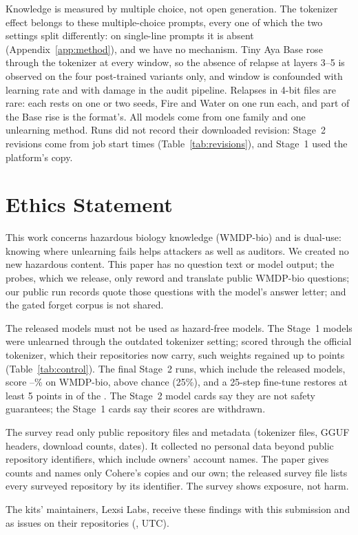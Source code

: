 \documentclass[11pt]{article}
\begin{document}
Knowledge is measured by multiple choice, not open generation. The tokenizer effect belongs to these multiple-choice prompts, every one of which the two settings split differently: on single-line prompts it is absent (Appendix~\ref{app:method}), and we have no mechanism. Tiny Aya Base rose through the tokenizer at every window, so the absence of relapse at layers 3--5 is observed on the four post-trained variants only, and window is confounded with learning rate and with damage in the audit pipeline. Relapses in 4-bit files are rare: each rests on one or two seeds, Fire and Water on one run each, and part of the Base rise is the format's. All models come from one family and one unlearning method. Runs did not record their downloaded revision: Stage~2 revisions come from job start times (Table~\ref{tab:revisions}), and Stage~1 used the platform's copy.

\section*{Ethics Statement}

This work concerns hazardous biology knowledge (WMDP-bio) and is dual-use: knowing where unlearning fails helps attackers as well as auditors. We created no new hazardous content. This paper has no question text or model output; the probes, which we release, only reword and translate public WMDP-bio questions; our public run records quote those questions with the model's answer letter; and the gated forget corpus is not shared.

The released models must not be used as hazard-free models. The Stage~1 models were unlearned through the outdated tokenizer setting; scored through the official tokenizer, which their repositories now carry, such weights regained up to \ctlMaxRise{} points (Table~\ref{tab:control}). The final Stage~2 runs, which include the released models, score \chkWmdpLow--\chkWmdpHigh\% on WMDP-bio, above chance (25\%), and a 25-step fine-tune restores at least 5 points in \chkFtUp{} of the \chkModels{}. The Stage~2 model cards say they are not safety guarantees; the Stage~1 cards say their scores are withdrawn.

The survey read only public repository files and metadata (tokenizer files, GGUF headers, download counts, dates). It collected no personal data beyond public repository identifiers, which include owners' account names. The paper gives counts and names only Cohere's copies and our own; the released survey file lists every surveyed repository by its identifier. The survey shows exposure, not harm.

The kits' maintainers, Lexsi Labs, receive these findings with this submission and as issues on their repositories (\reportsDate, UTC).



\clearpage
\appendix

\end{document}
